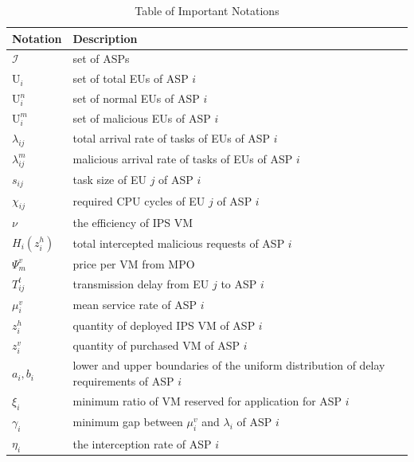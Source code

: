 \documentclass[10pt,journal, compsoc]{IEEEtran}
\begin{document}
\begin{table}[!t]
\centering
\caption{Table of Important Notations}
\label{notationlist}
\footnotesize
\begin{tabular}{|p{} |p{}|} \hline
 Notation & Description \\ \hline
 $\mathcal{I}$ & set of ASPs \\ \hline
 $\mathrm{U}_i$ & set of total EUs of ASP $i$ \\ \hline
 $\mathrm{U}_i^n$ & set of normal EUs of ASP $i$ \\ \hline
 $\mathrm{U}_i^m$ & set of malicious EUs of ASP $i$ \\ \hline
 $\lambda_{ij}$ & total arrival rate of tasks of EUs of ASP $i$ \\ \hline $\lambda_{ij}^m$ & malicious arrival rate of tasks of EUs of ASP $i$ \\ \hline
 $s_{ij}$ & task size of EU $j$ of ASP $i$ \\ \hline
 $\chi_{ij}$ & required CPU cycles of EU $j$ of ASP $i$ \\ \hline
 $\nu$ & the efficiency of IPS VM \\ \hline
$H_i(z_i^h)$ & total intercepted malicious requests of ASP $i$ \\ \hline
$\Psi_m^v$ & price per VM from MPO \\ \hline
 $T_{ij}^t$ & transmission delay from EU $j$ to ASP $i$ \\ \hline
 $\mu_i^v$ & mean service rate of ASP $i$ \\ \hline
 $z_i^h$ & quantity of deployed IPS VM of ASP $i$ \\ \hline
 $z_i^v$ & quantity of purchased VM of ASP $i$ \\ \hline
 $a_i, b_i$ & lower and upper boundaries of the uniform distribution of delay requirements of ASP $i$ \\ \hline
 $\xi_i$ & minimum ratio of VM reserved for application for ASP $i$  \\ \hline
 $\gamma_i$ & minimum gap between $\mu_i^v$ and $\lambda_i$ of ASP $i$ \\ \hline
 $\eta_i$ & the interception rate of ASP $i$ \\ \hline
\end{tabular}
\end{table}
\end{document}
